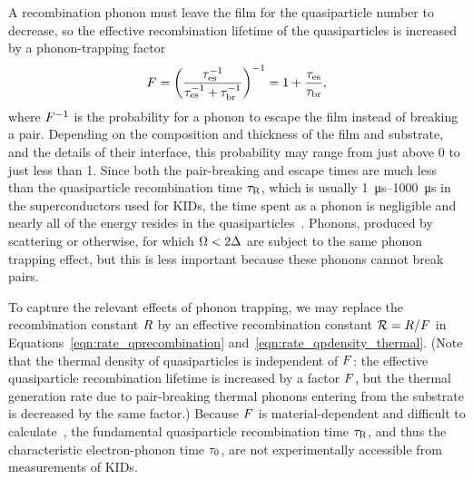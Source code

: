 A recombination phonon must leave the film for the quasiparticle number to decrease, so the effective recombination lifetime of the quasiparticles is increased by a phonon-trapping factor~\autocite{Rothwarf1967PRL}
\begin{equation}
F
  =
  \left( \frac{\tau_\mathrm{es}^{-1}}{\tau_\mathrm{es}^{-1} + \tau_\mathrm{br}^{-1}} \right)^{-1}
  =
  1 + \frac{\tau_\mathrm{es}}{\tau_\mathrm{br}},
\label{eqn:phonontrapping}
\end{equation}
where $F^{-1}$ is the probability for a phonon to escape the film instead of breaking a pair.
Depending on the composition and thickness of the film and substrate, and the details of their interface, this probability may range from just above 0 to just less than 1.
Since both the pair-breaking and escape times are much less than the quasiparticle recombination time $\tau_\mathrm{R}$, which is usually \SIrange{1}{1000}{\micro\second} in the superconductors used for KIDs, the time spent as a phonon is negligible and nearly all of the energy resides in the quasiparticles~\autocite{Rothwarf1974PRL}.
Phonons, produced by scattering or otherwise, for which $\Omega < 2 \Delta$ are subject to the same phonon trapping effect, but this is less important because these phonons cannot break pairs.

To capture the relevant effects of phonon trapping, we may replace the recombination constant $R$ by an effective recombination constant
$\mathcal{R} = R / F$
in Equations~\ref{eqn:rate_qprecombination} and~\ref{eqn:rate_qpdensity_thermal}.
(Note that the thermal density of quasiparticles is independent of $F$: the effective quasiparticle recombination lifetime is increased by a factor $F$, but the thermal generation rate due to pair-breaking thermal phonons entering from the substrate is decreased by the same factor.)
Because $F$ is material-dependent and difficult to calculate~\autocite{Gray1981Chapter5}, the fundamental quasiparticle recombination time $\tau_\mathrm{R}$, and thus the characteristic electron-phonon time $\tau_0$, are not experimentally accessible from measurements of KIDs.

